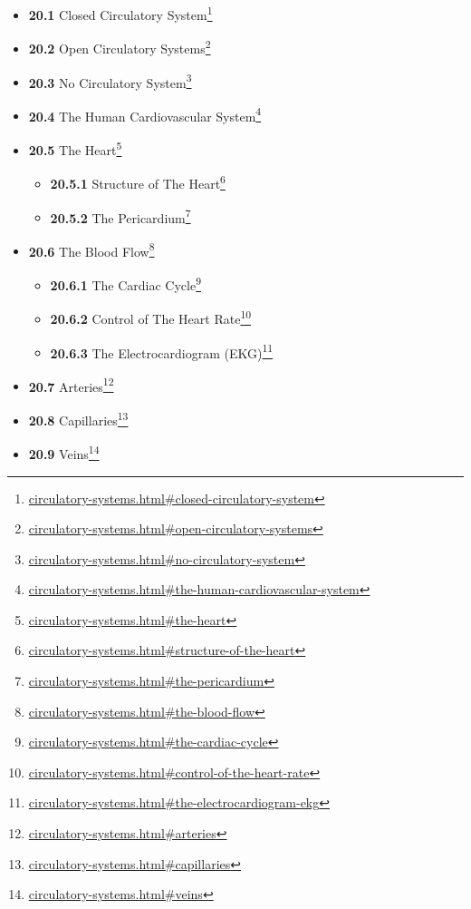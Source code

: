 \documentclass[
]{article}
\providecommand{\tightlist}{%
  \setlength{\itemsep}{0pt}\setlength{\parskip}{0pt}}
\providecommand{\tightlist}{%
  \setlength{\itemsep}{0pt}\setlength{\parskip}{0pt}}
\let\rmarkdownfootnote\footnote%
\def\footnote{\protect\rmarkdownfootnote}
\renewcommand{\href}[2]{#2\footnote{\url{#1}}}
\theoremstyle{definition}
\theoremstyle{definition}
\theoremstyle{definition}
\theoremstyle{remark}
\begin{document}
\begin{itemize}
  \begin{itemize}
  \tightlist
  \item
    \href{circulatory-systems.html\#closed-circulatory-system}{\emph{}\textbf{20.1}
    Closed Circulatory System}
  \item
    \href{circulatory-systems.html\#open-circulatory-systems}{\emph{}\textbf{20.2}
    Open Circulatory Systems}
  \item
    \href{circulatory-systems.html\#no-circulatory-system}{\emph{}\textbf{20.3}
    No Circulatory System}
  \item
    \href{circulatory-systems.html\#the-human-cardiovascular-system}{\emph{}\textbf{20.4}
    The Human Cardiovascular System}
  \item
    \href{circulatory-systems.html\#the-heart}{\emph{}\textbf{20.5} The
    Heart}

    \begin{itemize}
    \tightlist
    \item
      \href{circulatory-systems.html\#structure-of-the-heart}{\emph{}\textbf{20.5.1}
      Structure of The Heart}
    \item
      \href{circulatory-systems.html\#the-pericardium}{\emph{}\textbf{20.5.2}
      The Pericardium}
    \end{itemize}
  \item
    \href{circulatory-systems.html\#the-blood-flow}{\emph{}\textbf{20.6}
    The Blood Flow}

    \begin{itemize}
    \tightlist
    \item
      \href{circulatory-systems.html\#the-cardiac-cycle}{\emph{}\textbf{20.6.1}
      The Cardiac Cycle}
    \item
      \href{circulatory-systems.html\#control-of-the-heart-rate}{\emph{}\textbf{20.6.2}
      Control of The Heart Rate}
    \item
      \href{circulatory-systems.html\#the-electrocardiogram-ekg}{\emph{}\textbf{20.6.3}
      The Electrocardiogram (EKG)}
    \end{itemize}
  \item
    \href{circulatory-systems.html\#arteries}{\emph{}\textbf{20.7}
    Arteries}
  \item
    \href{circulatory-systems.html\#capillaries}{\emph{}\textbf{20.8}
    Capillaries}
  \item
    \href{circulatory-systems.html\#veins}{\emph{}\textbf{20.9} Veins}


\end{itemize}
\end{itemize}
\end{document}
